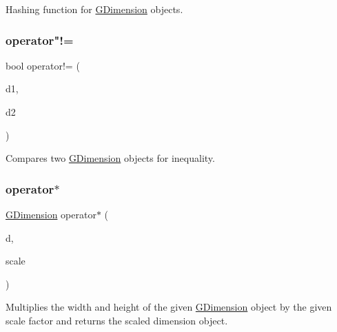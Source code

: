 Hashing function for \mbox{\hyperlink{classGDimension}{G\+Dimension}} objects. 

\mbox{\label{classGDimension_a38754b56ceecfaa7cbf3947a19c8ceb6}} 
\subsubsection{\texorpdfstring{operator"!=}{operator!=}}
{\footnotesize\ttfamily bool operator!= (\begin{DoxyParamCaption}\item[{const \mbox{\hyperlink{classGDimension}{G\+Dimension}} \&}]{d1,  }\item[{const \mbox{\hyperlink{classGDimension}{G\+Dimension}} \&}]{d2 }\end{DoxyParamCaption})\hspace{0.3cm}{\ttfamily [friend]}}



Compares two \mbox{\hyperlink{classGDimension}{G\+Dimension}} objects for inequality. 

\mbox{\label{classGDimension_a84a7c3c5763523efef91d5b6398c730c}} 
\subsubsection{\texorpdfstring{operator$\ast$}{operator*}}
{\footnotesize\ttfamily \mbox{\hyperlink{classGDimension}{G\+Dimension}} operator$\ast$ (\begin{DoxyParamCaption}\item[{const \mbox{\hyperlink{classGDimension}{G\+Dimension}} \&}]{d,  }\item[{double}]{scale }\end{DoxyParamCaption})\hspace{0.3cm}{\ttfamily [friend]}}



Multiplies the width and height of the given \mbox{\hyperlink{classGDimension}{G\+Dimension}} object by the given scale factor and returns the scaled dimension object. 

\mbox{\label{classGDimension_abcbb6e3b6e238b5155c96d6340bf5f43}} 
